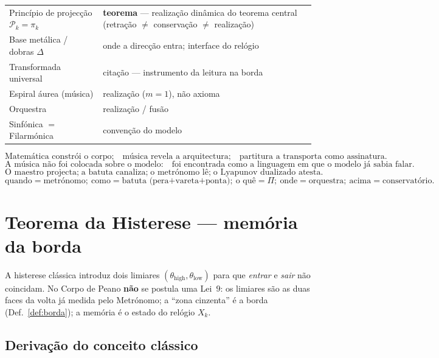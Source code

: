 \documentclass[11pt,a4paper]{article}
\begin{document}
\begin{center}
\begin{tabular}{@{}ll@{}}
Princípio de projecção $\mathcal{P}_k=\pi_k$ & \textbf{teorema}
  --- realização dinâmica do teorema central
  (retração $\neq$ conservação $\neq$ realização) \\
Base metálica / dobras $\Delta$ & onde a direcção entra; interface do relógio \\
Transformada universal & citação --- instrumento da leitura na borda \\
Espiral áurea (música) & realização ($m=1$), não axioma \\
Orquestra & realização / fusão \\
Sinfónica $=$ Filarmónica & convenção do modelo \\
\end{tabular}
\end{center}

\[
\boxed{
\text{Matemática constrói o corpo;}
\quad
\text{música revela a arquitectura;}
\quad
\text{partitura a transporta como assinatura.}
}
\]
\[
\boxed{
\text{A música não foi colocada sobre o modelo:}
\quad
\text{foi encontrada como a linguagem em que o modelo já sabia falar.}
}
\]
\[
\boxed{
\text{O maestro projecta;}
\;
\text{a batuta canaliza;}
\;
\text{o metrónomo lê;}
\;
\text{o Lyapunov dualizado atesta.}
}
\]
\[
\boxed{
\text{quando}=\text{metrónomo};\ 
\text{como}=\text{batuta (pera+vareta+ponta)};\ 
\text{o quê}=\Pi;\ 
\text{onde}=\text{orquestra};\ 
\text{acima}=\text{conservatório}.
}
\]

\section{Teorema da Histerese --- memória da borda}\label{sec:histerese}

A histerese clássica introduz dois limiares $(\theta_{\mathrm{high}},\theta_{\mathrm{low}})$
para que \emph{entrar} e \emph{sair} não coincidam. No Corpo de Peano
\textbf{não} se postula uma Lei~$9$: os limiares são as duas faces da
volta já medida pelo Metrónomo; a ``zona cinzenta'' é a borda
(Def.~\ref{def:borda}); a memória é o estado do relógio $X_k$.

\subsection*{Derivação do conceito clássico}
\end{document}
